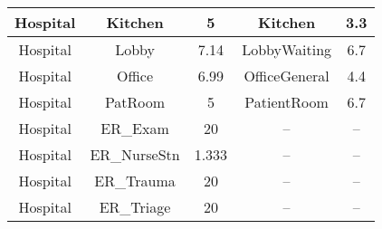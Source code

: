 \begin{table}
\begin{tabular}{|c|c|c|c|c|}
Hospital               & Kitchen                 & 5                                                                                                             & Kitchen                           & 3.3                                                                                                            \\ \hline
Hospital               & Lobby                   & 7.14                                                                                                          & LobbyWaiting                      & 6.7                                                                                                            \\ \hline
Hospital               & Office                  & 6.99                                                                                                          & OfficeGeneral                     & 4.4                                                                                                            \\ \hline
Hospital               & PatRoom                 & 5                                                                                                             & PatientRoom                       & 6.7                                                                                                            \\ \hline
Hospital               & ER\_Exam                & 20                                                                                                            & --                                & --                                                                                                             \\ \hline
Hospital               & ER\_NurseStn            & 1.333                                                                                                         & --                                & --                                                                                                             \\ \hline
Hospital               & ER\_Trauma              & 20                                                                                                            & --                                & --                                                                                                             \\ \hline
Hospital               & ER\_Triage              & 20                                                                                                            & --                                & --                                                                                                             \\ \hline

\end{tabular}
\end{table}
